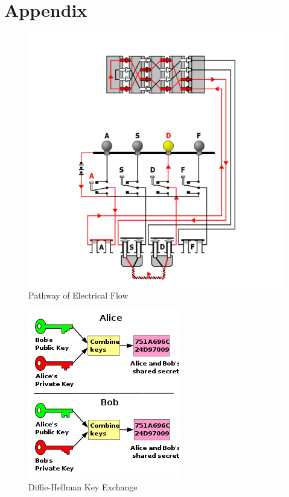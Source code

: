 \documentclass[conference,compsoc]{IEEEtran}
\begin{document}
\section{Appendix}
\begin{figure}[h!]
    \centering
    \includegraphics[scale = .7]{pathway.png}
    \caption{Pathway of Electrical Flow}
    \label{fig:path}
\end{figure}
\begin{figure}[h!]
    \centering
    \includegraphics[scale = .7]{dh-graph.png}
    \caption{Diffie-Hellman Key Exchange}
    \label{fig:dh}
\end{figure}
\end{document}
